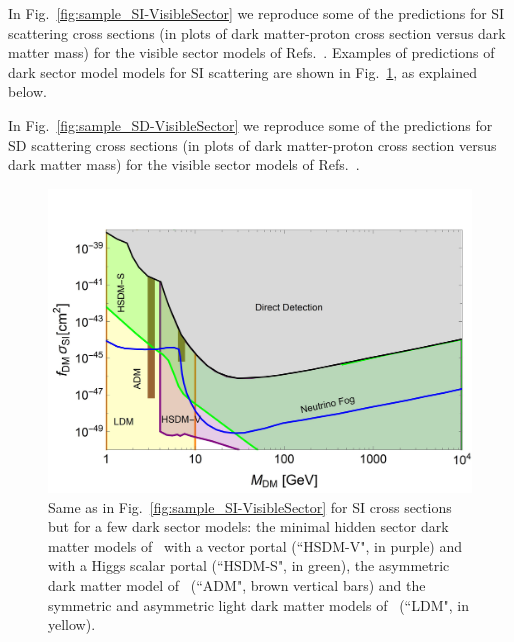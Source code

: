  In Fig.~\ref{fig:sample_SI-VisibleSector} we reproduce some of the predictions for SI scattering cross sections (in plots of dark matter-proton cross section versus dark matter mass)  for the visible sector models of Refs.~\cite{Lopez-Fogliani:2021qpq, Wang:2020xta, Cabrera:2019gaq, Alanne:2020jwx, Chen:2018uqz}. Examples of predictions of dark sector model models for SI scattering  are shown in Fig.~\ref{fig:sample_SI-DarkSector}, as explained below. 

In Fig.~\ref{fig:sample_SD-VisibleSector} we reproduce some of the predictions for SD scattering cross sections (in plots of dark matter-proton cross section versus dark matter mass)  for the visible sector models of Refs.~\cite{Lopez-Fogliani:2021qpq, Wang:2020xta, VanBeekveld:2021tgn, Singirala:2021gok, Barger:2008qd}. 

 
\begin{figure}[h]
\begin{center}
\includegraphics[width=0.80\columnwidth]{figures/sigmap_plot.jpg}
\caption{Same as in Fig.~\ref{fig:sample_SI-VisibleSector} for SI cross sections but for a few dark sector models: the minimal hidden sector dark matter models of~\cite{Evans:2017kti} with a vector portal (``HSDM-V", in purple) and with a Higgs scalar portal (``HSDM-S", in green), the asymmetric dark matter model of~\cite{Cohen:2010kn} (``ADM", brown vertical bars) and the symmetric and asymmetric light dark matter models of~\cite{Lin:2011gj} (``LDM", in yellow).}
\label{fig:sample_SI-DarkSector}
\end{center}
\end{figure}

